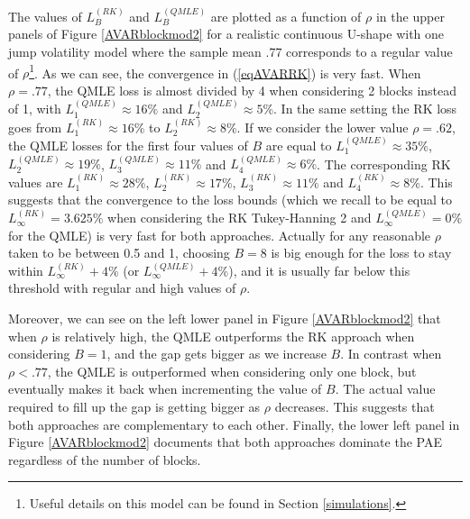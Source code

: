 \documentclass[11pt]{article}
\numberwithin{equation}{section}
\theoremstyle{plain}
\theoremstyle{remark}
\begin{document}
\smallskip
The values of $L_B^{(RK)}$ and $L_B^{(QMLE)}$ are plotted as a function of $\rho$ in the upper panels of Figure \ref{AVARblockmod2} for a realistic continuous U-shape with one jump volatility model where the sample mean $.77$ corresponds to a regular value of $\rho$\footnote{Useful details on this model can be found in Section \ref{simulations}.}. As we can see, the convergence in (\ref{eqAVARRK}) is very fast. When $\rho = .77$, the QMLE loss is almost divided by 4 when considering 2 blocks instead of 1, with $L_1^{(QMLE)} \approx 16 \%$ and $L_2^{(QMLE)} \approx 5 \%$. In the same setting the RK loss goes from $L_1^{(RK)} \approx 16 \%$ to $L_2^{(RK)} \approx 8 \%$. If we consider the lower value $\rho = .62$, the QMLE losses for the first four values of $B$ are equal to $L_1^{(QMLE)} \approx 35 \%$, $L_2^{(QMLE)} \approx 19 \%$, $L_3^{(QMLE)} \approx 11 \%$ and $L_4^{(QMLE)} \approx 6 \%$. The corresponding RK values are $L_1^{(RK)} \approx 28 \%$, $L_2^{(RK)} \approx 17 \%$, $L_3^{(RK)} \approx 11 \%$ and $L_4^{(RK)} \approx 8 \%$. This suggests that the convergence to the loss bounds (which we recall to be equal to $L_{\infty}^{(RK)} = 3.625 \%$ when considering the RK Tukey-Hanning 2 and $L_{\infty}^{(QMLE)} = 0 \%$ for the QMLE) is very fast for both approaches. Actually for any reasonable $\rho$ taken to be between 0.5 and 1, choosing $B=8$ is big enough for the loss to stay within $L_{\infty}^{(RK)} + 4\%$ (or $L_{\infty}^{(QMLE)} + 4\%$), and it is usually far below this threshold with regular and high values of $\rho$.  

\smallskip
Moreover, we can see on the left lower panel in Figure \ref{AVARblockmod2} that when $\rho$ is relatively high, the QMLE outperforms the RK approach when considering $B=1$, and the gap gets bigger as we increase $B$. In contrast when $\rho < .77$, the QMLE is outperformed when considering only one block, but eventually makes it back when incrementing the value of $B$. The actual value required to fill up the gap is getting bigger as $\rho$ decreases. This suggests that both approaches are complementary to each other. Finally, the lower left panel in Figure \ref{AVARblockmod2} documents that both approaches dominate the PAE regardless of the number of blocks.
\end{document}

